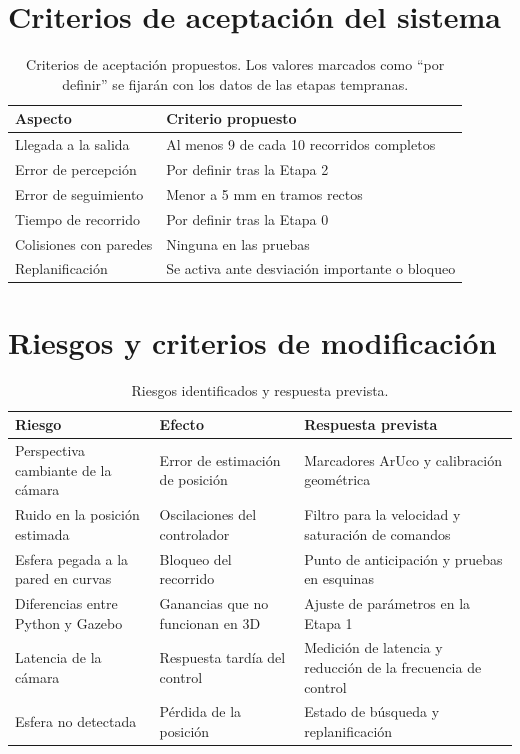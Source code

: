 \documentclass[11pt,a4paper]{article}
\begin{document}
\section{Criterios de aceptación del sistema}
\begin{table}[H]
    \centering
    \begin{tabular}{@{}p{5.5cm}p{7cm}@{}}
        \toprule
        \textbf{Aspecto} & \textbf{Criterio propuesto} \\
        \midrule
        Llegada a la salida & Al menos 9 de cada 10 recorridos completos \\
        Error de percepción & Por definir tras la Etapa 2 \\
        Error de seguimiento & Menor a 5 mm en tramos rectos \\
        Tiempo de recorrido & Por definir tras la Etapa 0 \\
        Colisiones con paredes & Ninguna en las pruebas \\
        Replanificación & Se activa ante desviación importante o bloqueo \\
        \bottomrule
    \end{tabular}
    \caption{Criterios de aceptación propuestos. Los valores marcados como ``por definir'' se fijarán con los datos de las etapas tempranas.}
\end{table}

\section{Riesgos y criterios de modificación}
\begin{table}[H]
    \centering
    \begin{tabular}{@{}p{4.5cm}p{4.5cm}p{4.5cm}@{}}
        \toprule
        \textbf{Riesgo} & \textbf{Efecto} & \textbf{Respuesta prevista} \\
        \midrule
        Perspectiva cambiante de la cámara & Error de estimación de posición & Marcadores ArUco y calibración geométrica \\
        Ruido en la posición estimada & Oscilaciones del controlador & Filtro para la velocidad y saturación de comandos \\
        Esfera pegada a la pared en curvas & Bloqueo del recorrido & Punto de anticipación y pruebas en esquinas \\
        Diferencias entre Python y Gazebo & Ganancias que no funcionan en 3D & Ajuste de parámetros en la Etapa 1 \\
        Latencia de la cámara & Respuesta tardía del control & Medición de latencia y reducción de la frecuencia de control \\
        Esfera no detectada & Pérdida de la posición & Estado de búsqueda y replanificación \\
        \bottomrule
    \end{tabular}
    \caption{Riesgos identificados y respuesta prevista.}
\end{table}
\end{document}
